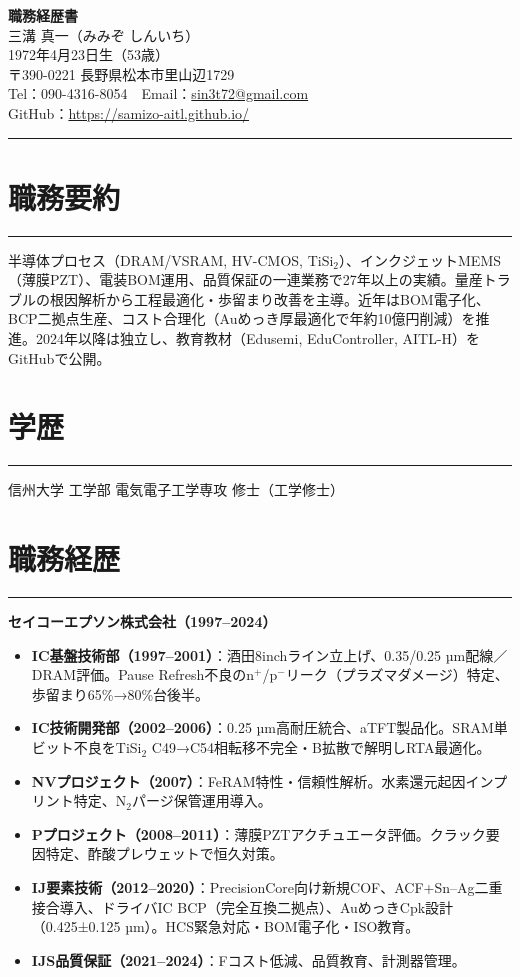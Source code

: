 \documentclass[11pt,ja=standard,engine=luatex]{bxjsarticle} %
\newcommand{\cvsection}[1]{\section*{#1}\vspace{-0.3em}\hrule\vspace{0.5em}}
\begin{document}
\begin{center}
{\Huge \textbf{職務経歴書}} \\[1.2em]
{\Large 三溝 真一（みみぞ しんいち）} \\[0.5em]
1972年4月23日生（53歳） \\[0.3em]
〒390-0221 長野県松本市里山辺1729 \\[0.3em]
Tel：090-4316-8054　Email：\href{mailto:sin3t72@gmail.com}{sin3t72@gmail.com} \\[0.3em]
GitHub：\href{https://samizo-aitl.github.io/}{https://samizo-aitl.github.io/}
\end{center}

\vspace{1em}
\hrule
\vspace{1em}

\cvsection{職務要約}
半導体プロセス（DRAM/VSRAM, HV-CMOS, TiSi$_2$）、インクジェットMEMS（薄膜PZT）、電装BOM運用、品質保証の一連業務で27年以上の実績。量産トラブルの根因解析から工程最適化・歩留まり改善を主導。近年はBOM電子化、BCP二拠点生産、コスト合理化（Auめっき厚最適化で年約10億円削減）を推進。2024年以降は独立し、教育教材（Edusemi, EduController, AITL-H）をGitHubで公開。

\cvsection{学歴}
信州大学 工学部 電気電子工学専攻 修士（工学修士）

\cvsection{職務経歴}
\textbf{セイコーエプソン株式会社（1997–2024）}

\begin{itemize}
  \item \textbf{IC基盤技術部（1997–2001）}：酒田8inchライン立上げ、0.35/0.25 µm配線／DRAM評価。Pause Refresh不良のn$^+$/p$^-$リーク（プラズマダメージ）特定、歩留まり65\%→80\%台後半。
  \item \textbf{IC技術開発部（2002–2006）}：0.25 µm高耐圧統合、aTFT製品化。SRAM単ビット不良をTiSi$_2$ C49→C54相転移不完全・B拡散で解明しRTA最適化。
  \item \textbf{NVプロジェクト（2007）}：FeRAM特性・信頼性解析。水素還元起因インプリント特定、N$_2$パージ保管運用導入。
  \item \textbf{Pプロジェクト（2008–2011）}：薄膜PZTアクチュエータ評価。クラック要因特定、酢酸プレウェットで恒久対策。
  \item \textbf{IJ要素技術（2012–2020）}：PrecisionCore向け新規COF、ACF+Sn–Ag二重接合導入、ドライバIC BCP（完全互換二拠点）、AuめっきCpk設計（0.425±0.125 µm）。HCS緊急対応・BOM電子化・ISO教育。
  \item \textbf{IJS品質保証（2021–2024）}：Fコスト低減、品質教育、計測器管理。
\end{itemize}
\end{document}
